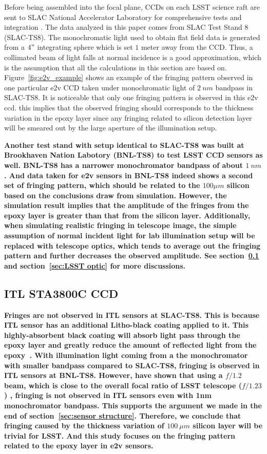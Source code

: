 \documentclass[twocolumn]{aastex63} %
\begin{document}
\begin{CJK*}{UTF8}{gbsn}
Before being assembled into the focal plane, CCDs on each LSST science raft are sent to SLAC National Accelerator Laboratory for comprehensive tests and integration \citep{Bond18,Ivezi19}. The data analyzed in this paper comes from SLAC Test Stand 8 (SLAC-TS8). The monochromatic light used to obtain flat field data is generated from a $4"$ integrating sphere which is set $1$ meter away from the CCD. Thus, a collimated beam of light falls at normal incidence is a good approximation, which is the assumption that all the calculations in this section are based on. Figure~\ref{fig:e2v_example} shows an example of the fringing pattern observed in one particular e2v CCD taken under monochromatic light of $2\ nm$ bandpass in SLAC-TS8. It is noticeable that only one fringing pattern is observed in this e2v ccd. this implies that the observed fringing should corresponds to the thickness variation in the epoxy layer since any fringing related to silicon detection layer will be smeared out by the large aperture of the illumination setup.

\textbf{Another test stand with setup identical to SLAC-TS8 was built at Brookhaven Nation Labotory (BNL-TS8) to test LSST CCD sensors as well. BNL-TS8 has a narrower monochromator bandpass of about $1\ nm$. And data taken for e2v sensors in BNL-TS8 indeed shows a second set of fringing pattern, which should be related to the $100\mu m$ silicon based on the conclusions draw from simulation. However, the simulation result implies that the amplitude of the fringes from the epoxy layer is greater than that from the silicon layer.  Additionally, when simulating realistic fringing in telescope image, the simple assumption of normal incident light for lab illumination setup will be replaced with telescope optics, which tends to average out the fringing pattern and further decreases the observed amplitude. See section~\ref{sec: ITL sensor} and section~\ref{sec:LSST optic} for more discussions.} 


\subsection{ITL STA3800C CCD} \label{sec: ITL sensor}
\textbf{Fringes are not observed in ITL sensors at SLAC-TS8. This is because ITL sensor has an additional Litho-black coating applied to it. This highly-absorbent black coating will absorb light pass through the epoxy layer and greatly reduce the amount of reflected light from the epoxy~\citep{Connor22}. With illumination light coming from a the monochromator with smaller bandpass compared to SLAC-TS8, fringing is observed in ITL sensors at BNL-TS8. However, \citet{Craig20} have shown that using a $f/1.2$ beam, which is close to the overall focal ratio of LSST telescope ($f/1.23$) \citep{Ivezi19}, fringing is not observed in ITL sensors even with 1nm monochromator bandpass. This supports the argument we made in the end of section~\ref{sec:sensor structure}. Therefore, we conclude that fringing caused by the thickness variation of $100\ \mu m$ silicon layer will be trivial for LSST. And this study focuses on the fringing pattern related to the epoxy layer in e2v sensors.}


\end{CJK*}
\end{document}
